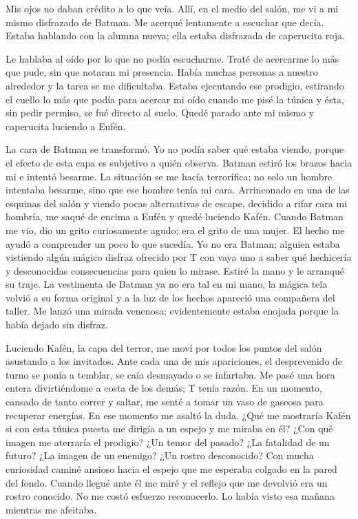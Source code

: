 \documentclass[11pt,twoside,openright,a5paper]{book}
\begin{document}
Mis ojos no daban crédito a lo que veía. Allí, en el medio del salón, me vi a mi mismo disfrazado de Batman. Me acerqué lentamente a escuchar que decía. Estaba hablando con la alumna nueva; ella estaba disfrazada de caperucita roja.

Le hablaba al oído por lo que no podía escucharme. Traté de acercarme lo más que pude, sin que notaran mi presencia. Había muchas personas a nuestro alrededor y la tarea se me dificultaba. Estaba ejecutando ese prodigio, estirando el cuello lo más que podía para acercar mi oído cuando me pisé la túnica y ésta, sin pedir permiso, se fué directo al suelo. Quedé parado ante mi mismo y caperucita luciendo a Eufén.

La cara de Batman se transformó. Yo no podía saber qué estaba viendo, porque el efecto de esta capa es subjetivo a quién observa. Batman estiró los brazos hacia mi e intentó besarme. La situación se me hacía terrorífica; no solo un hombre intentaba besarme, sino que ese hombre tenía mi cara. Arrinconado en una de las esquinas del salón y viendo pocas alternativas de escape, decidido a rifar cara mi hombría, me saqué de encima a Eufén y quedé luciendo Kafén. Cuando Batman me vio, dio un grito curiosamente agudo; era el grito de una mujer. El hecho me ayudó a comprender un poco lo que sucedía. Yo no era Batman; alguien estaba vistiendo algún mágico disfraz ofrecido por T con vaya uno a saber qué hechicería y desconocidas consecuencias para quien lo mirase. Estiré la mano y le arranqué su traje. La vestimenta de Batman ya no era tal en mi mano, la mágica tela volvió a su forma original y a la luz de los hechos apareció una compañera del taller. Me lanzó una mirada venenosa; evidentemente estaba enojada porque la había dejado sin disfraz.

Luciendo Kafén, la capa del terror, me moví por todos los puntos del salón asustando a los invitados. Ante cada una de mis apariciones, el desprevenido de turno se ponía a temblar, se caía desmayado o se infartaba. Me pasé una hora entera divirtiéndome a costa de los demás; T tenía razón. En un momento, cansado de tanto correr y saltar, me senté a tomar un vaso de gaseosa para recuperar energías. En ese momento me asaltó la duda. ¿Qué me mostraría Kafén si con esta túnica puesta me dirigía a un espejo y me miraba en él? ¿Con qué imagen me aterraría el prodigio? ¿Un temor del pasado? ¿La fatalidad de un futuro? ¿La imagen de un enemigo? ¿Un rostro desconocido? Con mucha curiosidad caminé ansioso hacia el espejo que me esperaba colgado en la pared del fondo. Cuando llegué ante él me miré y el reflejo que me devolvió era un rostro conocido. No me costó esfuerzo reconocerlo. Lo había visto esa mañana mientras me afeitaba.
\end{document}

